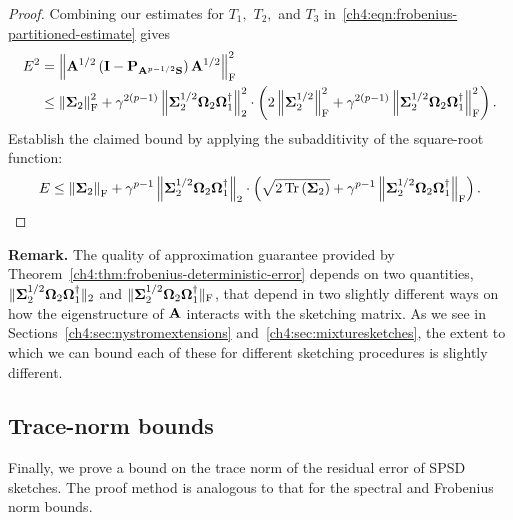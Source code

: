 \begin{proof}
Combining our estimates for $T_1,$ $T_2,$ and $T_3$ in~\eqref{ch4:eqn:frobenius-partitioned-estimate}
gives
\begin{equation*}
\begin{split}
E^2 & = \left\|\mathbf{A}^{1/2}\left(\mathbf{I} - 
           \mathbf{P}_{\mathbf{A}^{p-1/2}\mathbf{S}}\right)\mathbf{A}^{1/2}\right\|_\mathrm{F}^2 \\
  & \leq \left\|\mathbf{\Sigma}_2\right\|_\mathrm{F}^2 + \gamma^{2(p-1)} 
 \left\|\mathbf{\Sigma}_2^{1/2} \mathbf{\Omega}_2 \mathbf{\Omega}_1^\dagger\right\|_2^2 \cdot \left( 2\left\|\mathbf{\Sigma}_2^{1/2}\right\|_\mathrm{F}^2
 + \gamma^{2(p-1)} \left\|\mathbf{\Sigma}_2^{1/2} \mathbf{\Omega}_2 \mathbf{\Omega}_1^\dagger\right\|_\mathrm{F}^2\right).
\end{split}
\end{equation*}
Establish the claimed bound by applying the subadditivity of the square-root function:
\[
 E \leq \left\|\mathbf{\Sigma}_2\right\|_\mathrm{F} +  \gamma^{p-1} \left\|\mathbf{\Sigma}_2^{1/2} \mathbf{\Omega}_2 \mathbf{\Omega}_1^\dagger\right\|_2
  \cdot\left( \sqrt{ 2 \operatorname{Tr}\left(\mathbf{\Sigma}_2\right) } + \gamma^{p-1} \left\|\mathbf{\Sigma}_2^{1/2} \mathbf{\Omega}_2 \mathbf{\Omega}_1^\dagger\right\|_\mathrm{F} \right).
\]
\end{proof}

\noindent
\textbf{Remark.}
The quality of approximation guarantee provided by 
Theorem~\ref{ch4:thm:frobenius-deterministic-error} depends on two 
quantities, $\|\mathbf{\Sigma}_2^{1/2} \mathbf{\Omega}_2 \mathbf{\Omega}_1^\dagger\|_2$ and
$\|\mathbf{\Sigma}_2^{1/2} \mathbf{\Omega}_2 \mathbf{\Omega}_1^\dagger\|_{\mathrm{F}}$, that depend in two 
slightly different ways on how the eigenstructure of $\mathbf{A}$ 
interacts with the sketching matrix.
As we see in Sections~\ref{ch4:sec:nystromextensions} 
and~\ref{ch4:sec:mixturesketches}, the extent to which we can 
bound each of these for different sketching procedures is slightly different.


\subsection{Trace-norm bounds}
\label{ch4:sxn:theory-det-trace}

Finally, we prove a bound on the trace norm of the 
residual error of SPSD sketches.
The proof method is analogous to that for the spectral and Frobenius norm 
bounds.

